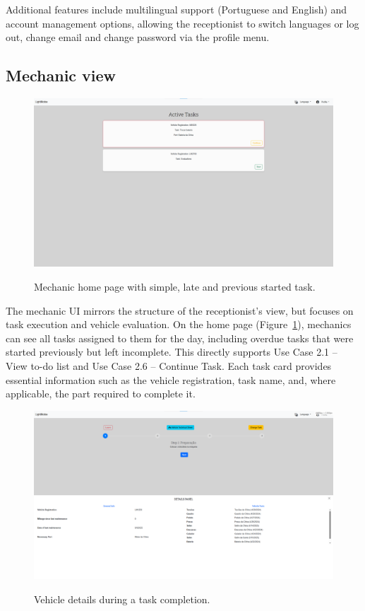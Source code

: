 Additional features include multilingual support (Portuguese and English) and account management options, allowing the receptionist to switch languages or log out, change email and change password via the profile menu.


\subsection{Mechanic view}


\begin{figure}[h]
  \caption{Mechanic home page with simple, late and previous started task.}
  \centering
  \includegraphics[width=\textwidth]{figs/Implementation/mechanic/HomeShowTasks}
  \label{fig:HomeShowTasks}
\end{figure}





The mechanic \ac{UI} mirrors the structure of the receptionist's view, but focuses on task execution and vehicle evaluation. On the home page (Figure~\ref{fig:HomeShowTasks}), mechanics can see all tasks assigned to them for the day, including overdue tasks that were started previously but left incomplete. This directly supports Use Case 2.1 – View to-do list and Use Case 2.6 – Continue Task. Each task card provides essential information such as the vehicle registration, task name, and, where applicable, the part required to complete it.



\begin{figure}[h]
  \caption{Vehicle details during a task completion.}
  \centering
  \includegraphics[width=\textwidth]{figs/Implementation/mechanic/MechanicTaskVehicleDetails}
  \label{fig:MechanicTaskVehicleDetails}
\end{figure}



